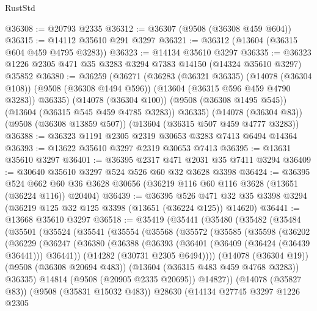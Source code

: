 \begin{lexlean}{RustStd}
\begin{coremodule}
@36308 := @20793 @2335
@36312 := @36307 (@9508 (@36308 @459 @604))
@36315 := @14112 @35610 @291 @3297
@36321 := @36312 (@13604 (@36315 @604 @459 @4795 @3283))
@36323 := @14134 @35610 @3297
@36335 := @36323 @1226 @2305 @471 @35 @3283 @3294 @7383 @14150 (@14324 @35610 @3297) @35852
@36380 := @36259
    (@36271
      (@36283
        (@36321 @36335)
        (@14078 (@36304 @108))
        (@9508 (@36308 @1494 @596))
        (@13604 (@36315 @596 @459 @4790 @3283))
        @36335)
      (@14078 (@36304 @100))
      (@9508 (@36308 @1495 @545))
      (@13604 (@36315 @545 @459 @4785 @3283))
      @36335)
    (@14078 (@36304 @83))
    (@9508 (@36308 @13859 @507))
    (@13604 (@36315 @507 @459 @4777 @3283))
@36388 := @36323 @1191 @2305 @2319 @30653 @3283 @7413 @6494 @14364
@36393 := @13622 @35610 @3297 @2319 @30653 @7413
@36395 := @13631 @35610 @3297
@36401 := @36395 @2317 @471 @2031 @35 @7411 @3294
@36409 := @30640 @35610 @3297 @524 @526 @60 @32 @3628 @3398
@36424 := @36395
    @524
    @662
    @60
    @36
    @3628
    @30656
    (@36219 @116 @60 @116 @3628 (@13651 (@36224 @116)) @20404)
@36439 := @36395
    @526
    @471
    @32
    @35
    @3398
    @3294
    (@36219 @125 @32 @125 @3398 (@13651 (@36224 @125)) @14620)
@36441 := @13668 @35610 @3297
@36518 := @35419
    (@35441
      (@35480
        (@35482
          (@35484
            (@35501
              (@35524
                (@35541
                  (@35554
                    (@35568
                      (@35572
                        (@35585
                          (@35598
                            (@36202
                              (@36229
                                (@36247
                                  (@36380
                                    (@36388
                                      (@36393 (@36401 (@36409 (@36424 (@36439 @36441))) @36441))
                                      (@14282 (@30731 @2305 @6494))))
                                  (@14078 (@36304 @19))
                                  (@9508 (@36308 @20694 @483))
                                  (@13604 (@36315 @483 @459 @4768 @3283))
                                  @36335)
                                @14814
                                (@9508 (@20905 @2335 @20695))
                                @14827))
                            (@14078 (@35827 @83))
                            (@9508 (@35831 @15032 @483))
                            @28630
                            (@14134
                              @27745
                              @3297
                              @1226
                              @2305

\end{coremodule}
\end{lexlean}
